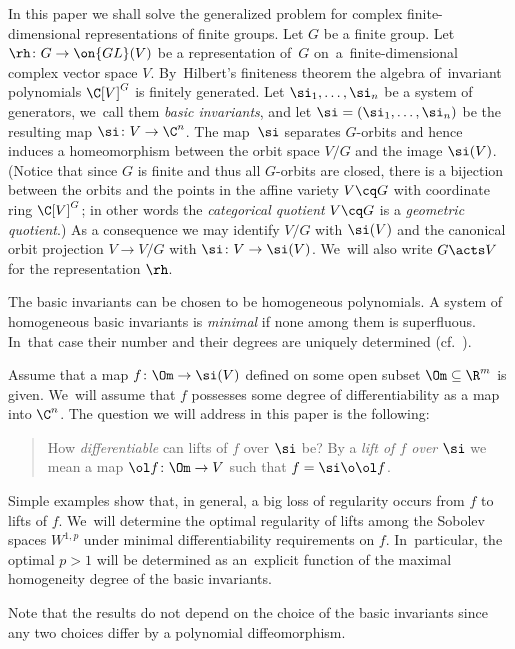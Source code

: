 In this paper we shall solve the generalized problem for complex finite-dimensional representations of finite groups.
Let $G$ be a finite group.
Let $\rh\colon G \to \on{GL}(V)$ be a representation of~$G$ on~a~finite-dimensional complex vector space $V$. By~Hilbert's finiteness theorem the algebra of~inva\-riant polynomials $\C[V]^G$ is finitely generated.
Let $\si_1,\dots,\si_n$ be a system of generators, we~call them \emph{basic invariants}, and let
$\si= (\si_1,\dots,\si_n)$ be the resulting map $\si \colon V \to \C^n$.
The map~$\si$ separates $G$-orbits and hence induces a homeomorphism between the orbit space $V/G$ and the image $\si(V)$.
(Notice that since $G$ is finite and thus all $G$-orbits are closed, there is a bijection between the orbits and
the points in the affine variety $V \cq G$ with coordinate ring $\C[V]^G$; in other words the \emph{categorical quotient}
$V \cq G$ is a \emph{geometric quotient}.)
As a consequence we may identify $V/G$ with $\si(V)$ and the canonical orbit projection $V \to V/G$ with $\si \colon V \to \si(V)$. We~will also write $G \acts V$ for the representation $\rh$.


The basic invariants can be chosen to be homogeneous polynomials. A system of homogeneous basic invariants is \emph{minimal} if
none among them is superfluous. In~that case their number and their degrees are uniquely determined (cf.\ \cite[p.~95]{DK02}).

Assume that a map $f \colon \Om \to \si(V)$ defined on some open subset $\Om \subseteq \R^m$ is given. We~will assume that $f$ possesses some degree of differentiability as a map into $\C^n$.
The question we will address in this paper is the following:
\begin{quote}
 How \emph{differentiable} can lifts of $f$ over $\si$ be? By a \emph{lift of $f$ over $\si$} we mean a map
 $\ol f \colon \Om \to V$ such that $f = \si \o \ol f$.
\end{quote}
Simple examples show that, in general, a big loss of regularity occurs from $f$ to lifts of $f$. We~will determine the optimal regularity of lifts among the Sobolev spaces $W^{1,p}$ under minimal differentiability
requirements on $f$. In~particular, the optimal $p>1$ will be determined as an~explicit function of the maximal homogeneity degree
of the basic invariants.

Note that the results do not depend on the choice of the basic invariants since any two choices differ by a polynomial
diffeomorphism.
